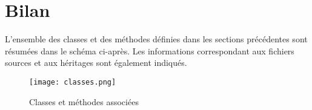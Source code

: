 \chapter[Bilan]{Bilan}

L'ensemble des classes et des méthodes définies dans les sections précédentes sont résumées dans le schéma ci-après. Les informations correspondant aux fichiers sources et aux héritages sont également indiqués.

\begin{figure}[H]
	\centering
	\texttt{[image: classes.png]}  \\
	\caption[Classes et méthodes associées]{Classes et méthodes associées}
	\label{fig:bilanclasses}
\end{figure}
